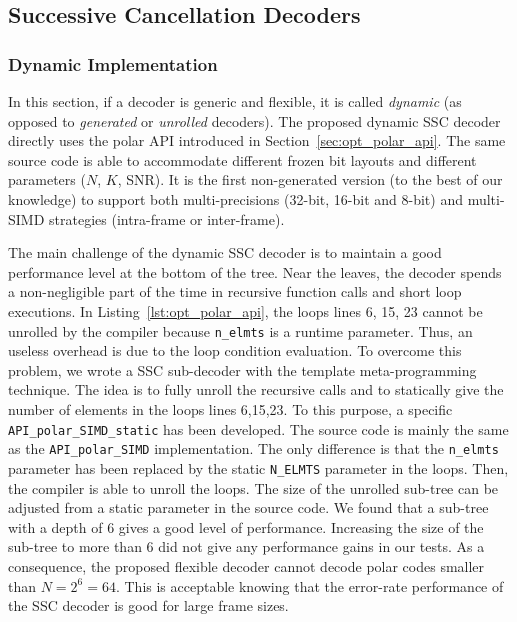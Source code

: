\subsection{Successive Cancellation Decoders}
\label{sec:opt_polar_sc}

\subsubsection{Dynamic Implementation}

In this section, if a decoder is generic and flexible, it is called
\emph{dynamic} (as opposed to \emph{generated} or \emph{unrolled} decoders). The
proposed dynamic SSC decoder directly uses the polar API introduced in
Section~\ref{sec:opt_polar_api}. The same source code is able to accommodate
different frozen bit layouts and different parameters ($N$, $K$, SNR). It is the
first non-generated version (to the best of our knowledge) to support both
multi-precisions (32-bit, 16-bit and 8-bit) and multi-SIMD strategies
(intra-frame or inter-frame).

The main challenge of the dynamic SSC decoder is to maintain a good performance
level at the bottom of the tree. Near the leaves, the decoder spends a
non-negligible part of the time in recursive function calls and short loop
executions. In Listing~\ref{lst:opt_polar_api}, the loops lines 6, 15, 23 cannot
be unrolled by the compiler because \verb|n_elmts| is a runtime parameter. Thus,
an useless overhead is due to the loop condition evaluation. To overcome this
problem, we wrote a SSC sub-decoder with the template meta-programming
technique. The idea is to fully unroll the recursive calls and to statically
give the number of elements in the loops lines 6,15,23. To this purpose, a
specific \verb|API_polar_SIMD_static| has been developed. The source code is
mainly the same as the \verb|API_polar_SIMD| implementation. The only difference
is that the \verb|n_elmts| parameter has been replaced by the static
\verb|N_ELMTS| parameter in the loops. Then, the compiler is able to unroll
the loops. The size of the unrolled sub-tree can be adjusted from a static
parameter in the source code. We found that a sub-tree with a depth of 6 gives
a good level of performance. Increasing the size of the sub-tree to more than 6
did not give any performance gains in our tests. As a consequence, the proposed
flexible decoder cannot decode polar codes smaller than $N = 2^6 = 64$. This is
acceptable knowing that the error-rate performance of the SSC decoder is good
for large frame sizes.

